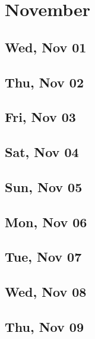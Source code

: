 \chapter{November}
	\section{Wed, Nov 01}
		
		
	\section{Thu, Nov 02}
		
		
	\section{Fri, Nov 03}
		
		
	\section{Sat, Nov 04}
		
		
	\section{Sun, Nov 05}
		
		
	\section{Mon, Nov 06}
		
		
	\section{Tue, Nov 07}
		
		
	\section{Wed, Nov 08}
		
		
	\section{Thu, Nov 09}
		
		
